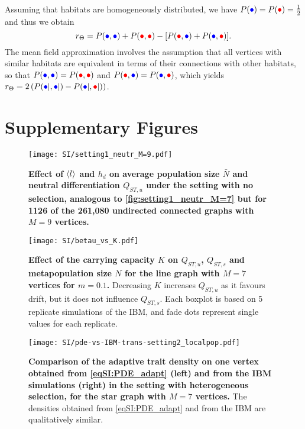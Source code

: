 Assuming that habitats are homogeneously distributed, we have $P(\bcirc) = P(\rcirc) = \frac{1}{2}$ and thus we obtain
\begin{equation}\label{eqSI:r_theta_homo}
  r_\Theta =   P(\bcirc,\bcirc) + P(\rcirc,\rcirc)   -  [ P(\rcirc,\bcirc) + P(\bcirc,\rcirc)].
\end{equation}
%
The mean field approximation involves the assumption that all vertices with similar habitats are equivalent in terms of their connections with other habitats, so that $P(\bcirc,\bcirc) = P(\rcirc,\rcirc)$ and $P(\rcirc,\bcirc) = P(\bcirc,\rcirc)$, which yields $r_\Theta = 2 \left( P({\bcirc|},{\bcirc|}) - P({\bcirc|},{\rcirc|}) \right)$.


\clearpage

\section{Supplementary Figures}

\begin{figure}[ht]
  \centerline{
      \texttt{[image: SI/setting1\_neutr\_M=9.pdf]} 
  }
  \caption{\textbf{Effect of $\langle l \rangle$ and $h_d$ on average population size $\bar{N}$ and neutral differentiation $Q_{ST,u}$ under the setting with no selection, analogous to \cref{fig:setting1_neutr_M=7} but for 1126 of the 261,080 undirected connected graphs with $M=9$ vertices.}}
  \label{figSI:setting1_neutr_M=9}
\end{figure}

\begin{figure}[ht]
  \centering
    \texttt{[image: SI/betau\_vs\_K.pdf]}
    \caption{\textbf{Effect of the carrying capacity $K$ on $Q_{ST,u}$, $Q_{ST,s}$ and metapopulation size $N$ for the line graph with $M=7$ vertices for $m=0.1$.} Decreasing $K$ increases $Q_{ST,u}$ as it favours drift, but it does not influence $Q_{ST,s}$. Each boxplot is based on 5 replicate simulations of the IBM, and fade dots represent single values for each replicate.}\label{betau_vs_K}
\end{figure}


\begin{figure}[ht]
  \centerline{
      \texttt{[image: SI/pde-vs-IBM-trans-setting2\_localpop.pdf]}}
    \caption{ \textbf{Comparison of the adaptive trait density on one vertex obtained from \cref{eqSI:PDE_adapt} (left) and from the IBM simulations (right) in the setting with heterogeneous selection, for the star graph with $M=7$ vertices.} The densities obtained from \cref{eqSI:PDE_adapt} and from the IBM are qualitatively similar.}
    \label{figSI:pde-vs-IBM-trans-setting2_localpop}
\end{figure}

